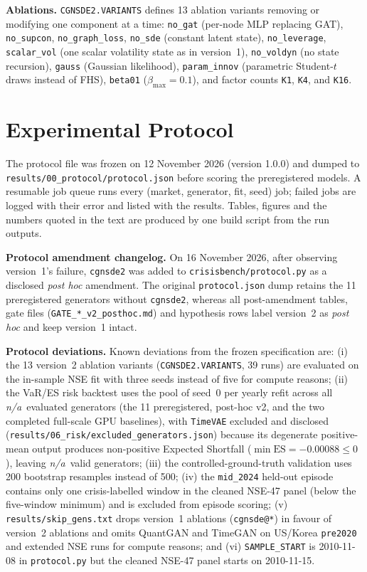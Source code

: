\documentclass[journal]{IEEEtran}
\newcommand{\pendingnum}{\textit{n/a}}
\providecommand{\nGenerators}{\pendingnum}
\providecommand{\nRiskGenerators}{\pendingnum}
\begin{document}
\textbf{Ablations.} \texttt{CGNSDE2.VARIANTS} defines 13 ablation variants removing or modifying one component
at a time: \texttt{no\_gat} (per-node MLP replacing GAT), \texttt{no\_supcon}, \texttt{no\_graph\_loss},
\texttt{no\_sde} (constant latent state), \texttt{no\_leverage}, \texttt{scalar\_vol} (one scalar volatility
state as in version~1), \texttt{no\_voldyn} (no state recursion), \texttt{gauss} (Gaussian likelihood),
\texttt{param\_innov} (parametric Student-$t$ draws instead of FHS), \texttt{beta01} ($\beta_{\max}=0.1$), and
factor counts \texttt{K1}, \texttt{K4}, and \texttt{K16}.

\section{Experimental Protocol}
The protocol file was frozen on 12 November 2026 (version 1.0.0) and dumped to
\texttt{results/00\_protocol/protocol.json} before scoring the preregistered models. A resumable job queue
runs every (market, generator, fit, seed) job; failed jobs are logged with their error and listed with the
results. Tables, figures and the numbers quoted in the text are produced by one build script from the run
outputs.

\textbf{Protocol amendment changelog.} On 16 November 2026, after observing version~1's failure,
\texttt{cgnsde2} was added to \texttt{crisisbench/protocol.py} as a disclosed \emph{post hoc} amendment. The
original \texttt{protocol.json} dump retains the 11 preregistered generators without \texttt{cgnsde2}, whereas
all post-amendment tables, gate files (\texttt{GATE\_*\_v2\_posthoc.md}) and hypothesis rows label version~2
as \emph{post hoc} and keep version~1 intact.

\textbf{Protocol deviations.} Known deviations from the frozen specification are: (i) the 13 version~2 ablation
variants (\texttt{CGNSDE2.VARIANTS}, 39 runs) are evaluated on the in-sample NSE fit with three seeds instead
of five for compute reasons; (ii) the VaR/ES risk backtest uses the pool of seed~0 per yearly refit across all
\nGenerators\ evaluated generators (the 11 preregistered, post-hoc v2, and the two completed full-scale GPU
baselines), with \texttt{TimeVAE} excluded and disclosed (\texttt{results/06\_risk/excluded\_generators.json})
because its degenerate positive-mean output produces non-positive Expected Shortfall ($\min\mathrm{ES}=-0.00088
\le 0$), leaving \nRiskGenerators\ valid generators; (iii) the controlled-ground-truth validation uses 200
bootstrap resamples instead of 500; (iv) the \texttt{mid\_2024} held-out episode contains only one
crisis-labelled window in the cleaned NSE-47 panel (below the five-window minimum) and is excluded from episode
scoring; (v) \texttt{results/skip\_gens.txt} drops version~1 ablations (\texttt{cgnsde@*}) in favour of
version~2 ablations and omits QuantGAN and TimeGAN on US/Korea \texttt{pre2020} and extended NSE runs for
compute reasons; and
(vi) \texttt{SAMPLE\_START} is 2010-11-08 in \texttt{protocol.py} but the cleaned NSE-47 panel starts on
2010-11-15.
\end{document}
